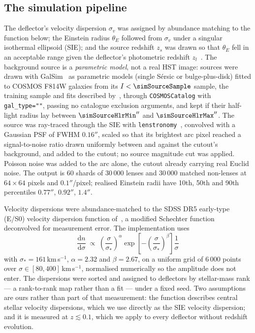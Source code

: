 \subsection{The simulation pipeline}
\label{sec:sim-pipeline}

The deflector's velocity dispersion $\sigma_v$ was assigned by abundance matching to the
function below; the Einstein radius $\theta_E$ followed from $\sigma_v$ under a singular
isothermal ellipsoid (SIE); and the source redshift $z_s$ was drawn so that $\theta_E$
fell in an acceptable range given the deflector's photometric redshift
$z_l$~\citep{euclidq1phz}. The background source is a
\emph{parametric model}, not a real HST image: sources were
drawn with GalSim~\citep{rowe2015galsim} as parametric models (single S\'ersic or
bulge-plus-disk) fitted to COSMOS F814W galaxies from its $I < \simSourceSample$ sample, the
training sample and fits described by~\citet{mandelbaum2014great3}, through
\texttt{COSMOSCatalog} with \texttt{gal\_type="\simSourceGalType"},
passing no catalogue exclusion arguments, and kept if their half-light radius lay between
$\simSourceHlrMin''$ and $\simSourceHlrMax''$. The source was ray-traced through the SIE with
\texttt{lenstronomy}~\citep{birrer2018lenstronomy, birrer2021lenstronomy}, convolved with a Gaussian PSF of FWHM $0.16''$,
scaled so that its brightest arc pixel reached a signal-to-noise ratio drawn uniformly
between \simArcSnrMin{} and \simArcSnrMax{} against the cutout's background, and added to
the cutout; no source magnitude cut was applied. Poisson noise was added to the
arc alone, the cutout already carrying real Euclid noise. The output is 60 shards of
30\,000 lenses and 30\,000 matched non-lenses at $64 \times 64$ pixels and $0.1''$/pixel;
realised Einstein radii have 10th, 50th and 90th percentiles $0.77''$, $0.92''$, $1.4''$.

Velocity dispersions were abundance-matched to the SDSS DR5 early-type (E/S0) velocity
dispersion function of~\citet{choi2007vdf}, a modified Schechter function deconvolved for
measurement error. The implementation uses
\begin{equation}
  \frac{\mathrm{d}n}{\mathrm{d}\sigma} \;\propto\;
  \left(\frac{\sigma}{\sigma_*}\right)^{\alpha}
  \exp\!\left[-\left(\frac{\sigma}{\sigma_*}\right)^{\beta}\right] \frac{1}{\sigma}
  \label{eq:vdf}
\end{equation}
with $\sigma_* = 161$\,km\,s$^{-1}$, $\alpha = 2.32$ and $\beta = 2.67$, on a uniform grid
of 6\,000 points over $\sigma \in [80, 400]$\,km\,s$^{-1}$, normalised numerically so the
amplitude does not enter. The dispersions were sorted and assigned to deflectors by
stellar-mass rank --- a rank-to-rank map rather than a fit --- under a fixed seed. Two
assumptions are ours rather than part of that measurement: the function describes central
stellar velocity dispersions, which we use directly as the SIE velocity dispersion; and it
is measured at $z \lesssim 0.1$, which we apply to every deflector without redshift
evolution.

